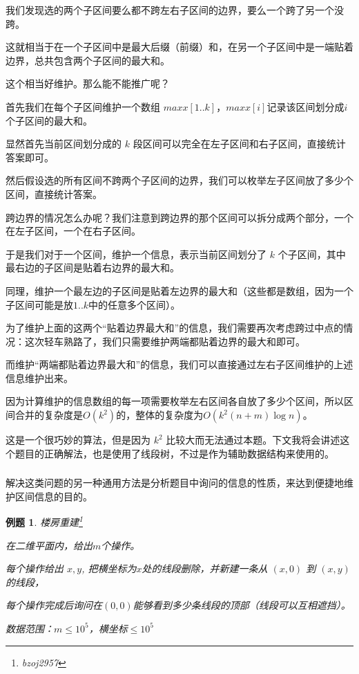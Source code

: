 \documentclass[a4paper]{article}
\newcommand{\kai}{\CJKfamily{kai}}
\newtheorem{problem}{例题}
\begin{document}
我们发现选的两个子区间要么都不跨左右子区间的边界，要么一个跨了另一个没跨。

这就相当于在一个子区间中是最大后缀（前缀）和，在另一个子区间中是一端贴着边界，总共包含两个子区间的最大和。

这个相当好维护。那么能不能推广呢？

首先我们在每个子区间维护一个数组 $maxx[1..k]$，$maxx[i]$记录该区间划分成$i$个子区间的最大和。

显然首先当前区间划分成的 $k$ 段区间可以完全在左子区间和右子区间，直接统计答案即可。

然后假设选的所有区间不跨两个子区间的边界，我们可以枚举左子区间放了多少个区间，直接统计答案。

跨边界的情况怎么办呢？我们注意到跨边界的那个区间可以拆分成两个部分，一个在左子区间，一个在右子区间。

于是我们对于一个区间，维护一个信息，表示当前区间划分了 $k$ 个子区间，其中最右边的子区间是贴着右边界的最大和。

同理，维护一个最左边的子区间是贴着左边界的最大和（这些都是数组，因为一个子区间可能是放$1..k$中的任意多个区间）。

为了维护上面的这两个“贴着边界最大和”的信息，我们需要再次考虑跨过中点的情况：这次轻车熟路了，我们只需要维护两端都贴着边界的最大和即可。

而维护“两端都贴着边界最大和”的信息，我们可以直接通过左右子区间维护的上述信息维护出来。

因为计算维护的信息数组的每一项需要枚举左右区间各自放了多少个区间，所以区间合并的复杂度是$O(k^2)$的，整体的复杂度为$O(k^2(n+m)\log n)$。

这是一个很巧妙的算法，但是因为 $k^2$ 比较大而无法通过本题。下文我将会讲述这个题目的正确解法，也是使用了线段树，不过是作为辅助数据结构来使用的。

\subsubsection{\kai{分析题目性质}}

解决这类问题的另一种通用方法是分析题目中询问的信息的性质，来达到便捷地维护区间信息的目的。

\begin{problem}
  楼房重建\footnote{bzoj2957}

  在二维平面内，给出$m$个操作。

  每个操作给出 $x,y$, 把横坐标为$x$处的线段删除，并新建一条从 $(x,0)$ 到 $(x,y)$ 的线段，

  每个操作完成后询问在$(0,0)$能够看到多少条线段的顶部（线段可以互相遮挡）。

  数据范围：$m\leq 10^5$，横坐标$\leq 10^5$
\end{problem}
\end{document}
